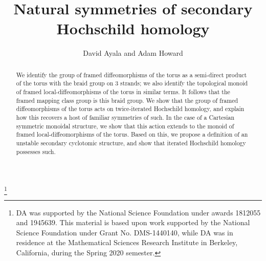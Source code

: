 \documentclass{amsart}
\theoremstyle{definition}
\theoremstyle{remark}
\begin{document}
\title{Natural symmetries of secondary Hochschild homology}


\author{David Ayala and Adam Howard}





\address{Department of Mathematics\\Montana State University\\Bozeman, MT 59717}
\address{Department of Mathematics\\Montana State University\\Bozeman, MT 59717}
\thanks{DA was supported by the National Science Foundation under awards 1812055 and 1945639.  This material is based upon work supported by the National Science Foundation under Grant No. DMS-1440140, while DA was in residence at the Mathematical Sciences Research Institute in Berkeley, California, during the Spring 2020 semester.}






\begin{abstract}
We identify the group of framed diffeomorphisms of the torus as a semi-direct product of the torus with the braid group on 3 strands; we also identify the topological monoid of framed local-diffeomorphisms of the torus in similar terms.
It follows that the framed mapping class group is this braid group.
We show that the group of framed diffeomorphisms of the torus acts on twice-iterated Hochschild homology, and explain how this recovers a host of familiar symmetries of such.  
In the case of a Cartesian symmetric monoidal structure, we show that this action extends to the monoid of framed local-diffeomorphisms of the torus.
Based on this, we propose a definition of an unstable secondary cyclotomic structure, and show that iterated Hochschild homology possesses such.  

\end{abstract}





\maketitle


\tableofcontents



%
%
%
%
%
%
%
%
\end{document}
